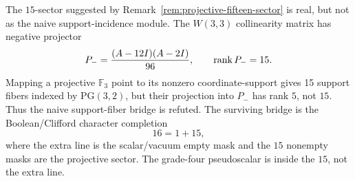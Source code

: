 \makeatletter
{}
\makeatother

\begin{theorem}
\label{thm:projective-fifteen-refinement}
The $15$-sector suggested by Remark~\ref{rem:projective-fifteen-sector} is real,
but not as the naive support-incidence module.  The $W(3,3)$ collinearity matrix
has negative projector
\[
  P_-={(A-12I)(A-2I)\over 96},\qquad \operatorname{rank}P_-=15.
\]
Mapping a projective $\mathbb F_3$ point to its nonzero coordinate-support gives
15 support fibers indexed by $\mathrm{PG}(3,2)$, but their projection into
$P_-$ has rank $5$, not $15$.  Thus the naive support-fiber bridge is refuted.
The surviving bridge is the Boolean/Clifford character completion
\[
  16=1+15,
\]
where the extra line is the scalar/vacuum empty mask and the $15$ nonempty masks
are the projective sector.  The grade-four pseudoscalar is inside the $15$,
not the extra line.
\end{theorem}
